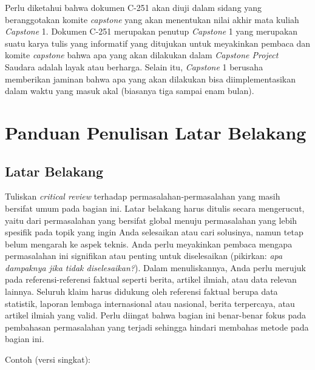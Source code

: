     Perlu diketahui bahwa dokumen C-251 akan diuji dalam sidang yang beranggotakan komite \textit{capstone} yang akan menentukan nilai akhir mata kuliah \textit{Capstone} 1. Dokumen C-251 merupakan penutup \textit{Capstone} 1 yang merupakan suatu karya tulis yang informatif yang ditujukan untuk meyakinkan pembaca dan komite \textit{capstone} bahwa apa yang akan dilakukan dalam \textit{Capstone Project} Saudara adalah layak atau berharga. Selain itu, \textit{Capstone} 1 berusaha memberikan jaminan bahwa apa yang akan dilakukan bisa diimplementasikan dalam waktu yang masuk akal (biasanya tiga sampai enam bulan).
    

\section{Panduan Penulisan Latar Belakang}
\label{sec:Panduan_Penulisan_Pengantar}

    \subsection{Latar Belakang}
    \label{subsec:Latar_Belakang}

    Tuliskan \textit{critical review} terhadap permasalahan-permasalahan yang masih bersifat umum pada bagian ini. Latar belakang harus ditulis secara mengerucut, yaitu dari permasalahan yang bersifat global menuju permasalahan yang lebih spesifik pada topik yang ingin Anda selesaikan atau cari solusinya, namun tetap belum mengarah ke aspek teknis. Anda perlu meyakinkan pembaca mengapa permasalahan ini signifikan atau penting untuk diselesaikan (pikirkan: \textit{apa dampaknya jika tidak diselesaikan?}). Dalam menuliskannya, Anda perlu merujuk pada referensi-referensi faktual seperti berita, artikel ilmiah, atau data relevan lainnya. Seluruh klaim harus didukung oleh referensi faktual berupa data statistik, laporan lembaga internasional atau nasional, berita terpercaya, atau artikel ilmiah yang valid. Perlu diingat bahwa bagian ini benar-benar fokus pada pembahasan permasalahan yang terjadi sehingga hindari membahas metode pada bagian ini.
    \vspace{6pt}

    \noindent
    Contoh (versi singkat):

